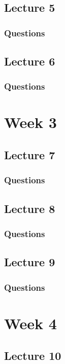 \documentclass{report}
\begin{document}
\newpage
\section{Lecture 5}
\subsection*{Questions}

\newpage
\section{Lecture 6}
\subsection*{Questions}

\chapter{Week 3}
\section{Lecture 7}
\subsection*{Questions}

\newpage
\section{Lecture 8}
\subsection*{Questions}
\qs{}{}

\newpage
\section{Lecture 9}
\subsection*{Questions}
\qs{}{}

\chapter{Week 4}
\section{Lecture 10}
\end{document}
